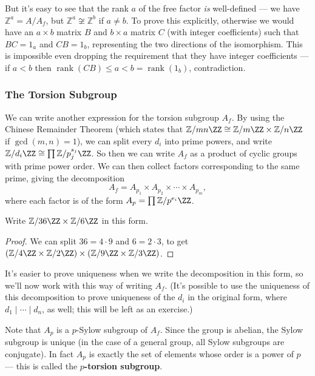 But it's easy to see that the rank $a$ of the free factor \emph{is} well-defined --- we have $\mathbb{Z}^a = A/A_f$, but $\mathbb{Z}^a \not\cong \mathbb{Z}^b$ if $a \neq b$. To prove this explicitly, otherwise we would have an $a \times b$ matrix $B$ and $b \times a$ matrix $C$ (with integer coefficients) such that $BC = 1_a$ and $CB = 1_b$, representing the two directions of the isomorphism. This is impossible even dropping the requirement that they have integer coefficients --- if $a < b$ then $\operatorname{rank}(CB) \leq a < b = \operatorname{rank}(1_b)$, contradiction.

\subsubsection{The Torsion Subgroup}

We can write another expression for the torsion subgroup $A_f$. By using the Chinese Remainder Theorem (which states that $\mathbb{Z}/mn\ZZ \cong \mathbb{Z}/m\ZZ \times \mathbb{Z}/n\ZZ$ if $\gcd(m, n) = 1$), we can split every $d_i$ into prime powers, and write $\mathbb{Z}/d_i\ZZ \cong \prod \mathbb{Z}/p_j^{s_j}\ZZ$. So then we can write $A_f$ as a product of cyclic groups with prime power order. We can then collect factors corresponding to the same prime, giving the decomposition \[A_f = A_{p_1} \times A_{p_2} \times \cdots \times A_{p_m},\] where each factor is of the form $A_p = \prod \mathbb{Z}/p^{e_i}\ZZ$. 

\begin{example}
    Write $\mathbb{Z}/36\ZZ \times \mathbb{Z}/6\ZZ$ in this form. 
\end{example}

\begin{proof}
    We can split $36 = 4\cdot 9$ and $6 = 2\cdot 3$, to get $(\mathbb{Z}/4\ZZ \times \mathbb{Z}/2\ZZ) \times (\mathbb{Z}/9\ZZ \times \mathbb{Z}/3\ZZ)$.
\end{proof}

It's easier to prove uniqueness when we write the decomposition in this form, so we'll now work with this way of writing $A_f$. (It's possible to use the uniqueness of this decomposition to prove uniqueness of the $d_i$ in the original form, where $d_1 \mid \cdots \mid d_n$, as well; this will be left as an exercise.)

Note that $A_p$ is a $p$-Sylow subgroup of $A_f$. Since the group is abelian, the Sylow subgroup is unique (in the case of a general group, all Sylow subgroups are conjugate). In fact $A_p$ is exactly the set of elements whose order is a power of $p$ --- this is called the \textbf{$p$-torsion subgroup}. 

